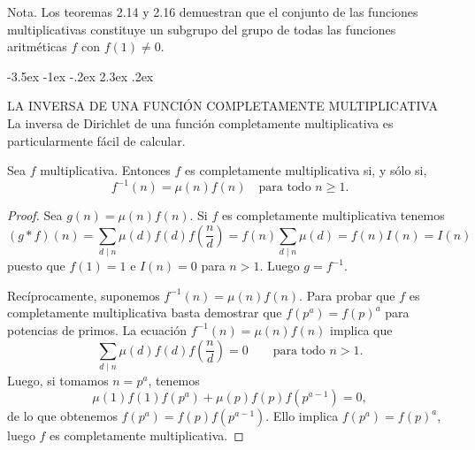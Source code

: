 \documentclass[12pt,a4paper]{book}
\makeatletter
\renewcommand\section{\@startsection{section}{1}{\z@}%
  {-3.5ex \@plus -1ex \@minus -.2ex}%
  {2.3ex \@plus .2ex}%
  {\normalfont\Large\bfseries\raggedright}}
\makeatother
\begin{document}
    Nota. Los teoremas 2.14 y 2.16 demuestran que el conjunto de las funciones
    multiplicativas constituye un subgrupo del grupo de todas las funciones aritméticas $f$
    con $f(1)\neq0$.

    \section{LA INVERSA DE UNA FUNCIÓN COMPLETAMENTE MULTIPLICATIVA}
    La inversa de Dirichlet de una función completamente multiplicativa es
    particularmente fácil de calcular.

    \begin{teorema}
        Sea $f$ multiplicativa. Entonces $f$ es completamente multiplicativa si, y sólo
        si,
        \begin{equation*}
            f^{-1}(n)=\mu(n)f(n)\quad\text{para todo } n\geq1.
        \end{equation*}
    \end{teorema}

    \begin{proof}
        Sea $g(n)=\mu(n)f(n)$. Si $f$ es completamente multiplicativa tenemos
        \begin{equation*}
            (g*f)(n)=\sum_{d\mid n}\mu(d)f(d)f\left(\frac{n}{d}\right)
            =f(n)\sum_{d\mid n}\mu(d)=f(n)I(n)=I(n)
        \end{equation*}
        puesto que $f(1)=1$ e $I(n)=0$ para $n>1$. Luego $g=f^{-1}$.

        Recíprocamente, suponemos $f^{-1}(n)=\mu(n)f(n)$. Para probar que $f$ es
        completamente multiplicativa basta demostrar que $f(p^{a})=f(p)^{a}$ para potencias de
        primos. La ecuación $f^{-1}(n)=\mu(n)f(n)$ implica que
        \begin{equation*}
            \sum_{d\mid n}\mu(d)f(d)f\left(\frac{n}{d}\right)=0\qquad\text{para todo } n>1.
        \end{equation*}
        Luego, si tomamos $n=p^{a}$, tenemos
        \begin{equation*}
            \mu(1)f(1)f(p^{a})+\mu(p)f(p)f(p^{a-1})=0,
        \end{equation*}
        de lo que obtenemos $f(p^{a})=f(p)f(p^{a-1})$. Ello implica $f(p^{a})=f(p)^{a}$, luego $f$
        es completamente multiplicativa.
    \end{proof}
\end{document}
